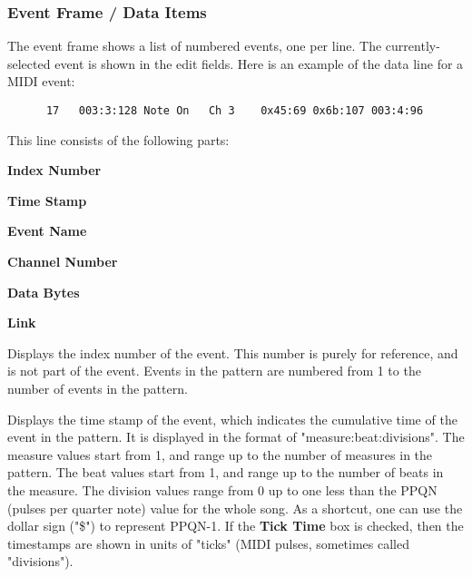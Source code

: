 \subsubsection{Event Frame / Data Items}
\label{subsec:event_frame_data}

   The event frame shows a list of numbered events, one per line.
   The currently-selected event is shown in the edit fields.
   Here is an example of the data line for a MIDI event:

   \begin{verbatim}
      17   003:3:128 Note On   Ch 3    0x45:69 0x6b:107 003:4:96
   \end{verbatim}

   This line consists of the following parts:

   \begin{enumber}
      \item \textbf{Index Number}
      \item \textbf{Time Stamp}
      \item \textbf{Event Name}
      \item \textbf{Channel Number}
      \item \textbf{Data Bytes}
      \item \textbf{Link}
   \end{enumber}

   \setcounter{ItemCounter}{0}      %

   Displays the index number of the event.
   This number is purely for reference, and is not part
   of the event.  Events in the pattern are numbered from 1 to the number of
   events in the pattern.

   Displays the time stamp of the event,
   which indicates the cumulative time of the event in the pattern.
   It is displayed in the format of "measure:beat:divisions".
   The measure values start from 1, and range up to the number of measures in
   the pattern.
   The beat values start from 1, and range up to the number of beats in the
   measure.
   The division values range from 0 up to one less than the
   PPQN (pulses per quarter note) value for the whole song.
   As a shortcut, one can use the dollar sign ("\$") to represent
   PPQN-1.
   If the \textbf{Tick Time} box is checked, then the timestamps are
   shown in units of "ticks" (MIDI pulses, sometimes called "divisions").

